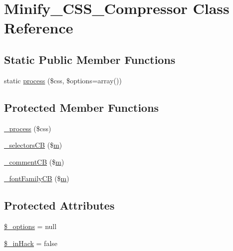 \hypertarget{class_minify___c_s_s___compressor}{}\section{Minify\+\_\+\+C\+S\+S\+\_\+\+Compressor Class Reference}
\label{class_minify___c_s_s___compressor}
\subsection*{Static Public Member Functions}
\begin{DoxyCompactItemize}
\item 
static \hyperlink{class_minify___c_s_s___compressor_a57ecacdd2bca0a7441d8eda7c409306b}{process} (\$css, \$options=array())
\end{DoxyCompactItemize}
\subsection*{Protected Member Functions}
\begin{DoxyCompactItemize}
\item 
\hyperlink{class_minify___c_s_s___compressor_a9582e18b72e25a20ef779dd0678c666f}{\+\_\+process} (\$css)
\item 
\hyperlink{class_minify___c_s_s___compressor_aea029ba0d0a267bdd3dfb1f3c7fa62cc}{\+\_\+selectors\+CB} (\$\hyperlink{_chart_8min_8js_a9e77e016b2928d7dcb493b89a0c9dc32}{m})
\item 
\hyperlink{class_minify___c_s_s___compressor_adcc2cc65695e86d694a6b5563660264e}{\+\_\+comment\+CB} (\$\hyperlink{_chart_8min_8js_a9e77e016b2928d7dcb493b89a0c9dc32}{m})
\item 
\hyperlink{class_minify___c_s_s___compressor_a3599150d0e20c1f74db13c6132ff824d}{\+\_\+font\+Family\+CB} (\$\hyperlink{_chart_8min_8js_a9e77e016b2928d7dcb493b89a0c9dc32}{m})
\end{DoxyCompactItemize}
\subsection*{Protected Attributes}
\begin{DoxyCompactItemize}
\item 
\hyperlink{class_minify___c_s_s___compressor_a1bebdc689c84eee59ad24c77e5531762}{\$\+\_\+options} = null
\item 
\hyperlink{class_minify___c_s_s___compressor_a2ab85deb779cfccba3087bd0efa85ecb}{\$\+\_\+in\+Hack} = false
\end{DoxyCompactItemize}


